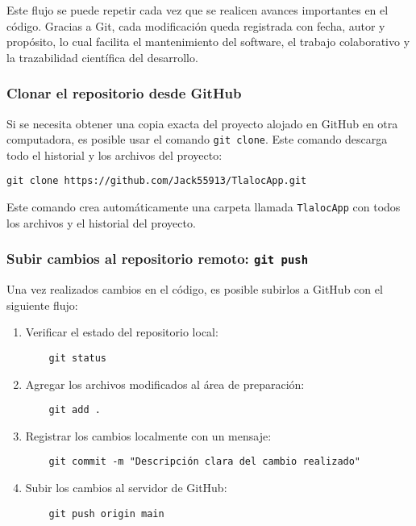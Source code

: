 Este flujo se puede repetir cada vez que se realicen avances importantes en el código. Gracias a Git, cada modificación queda registrada con fecha, autor y propósito, lo cual facilita el mantenimiento del software, el trabajo colaborativo y la trazabilidad científica del desarrollo.

\subsubsection*{Clonar el repositorio desde GitHub}

Si se necesita obtener una copia exacta del proyecto alojado en GitHub en otra computadora, es posible usar el comando \texttt{git clone}. Este comando descarga todo el historial y los archivos del proyecto:

\begin{center}
  \begin{verbatim}
git clone https://github.com/Jack55913/TlalocApp.git
\end{verbatim}
\end{center}

Este comando crea automáticamente una carpeta llamada \texttt{TlalocApp} con todos los archivos y el historial del proyecto.

\subsubsection*{Subir cambios al repositorio remoto: \texttt{git push}}

Una vez realizados cambios en el código, es posible subirlos a GitHub con el siguiente flujo:

\begin{enumerate}
    \item Verificar el estado del repositorio local:
    \begin{verbatim}
    git status
    \end{verbatim}
    
    \item Agregar los archivos modificados al área de preparación:
    \begin{verbatim}
    git add .
    \end{verbatim}
    
    \item Registrar los cambios localmente con un mensaje:
    \begin{verbatim}
    git commit -m "Descripción clara del cambio realizado"
    \end{verbatim}
    
    \item Subir los cambios al servidor de GitHub:
    \begin{verbatim}
    git push origin main
    \end{verbatim}
\end{enumerate}

